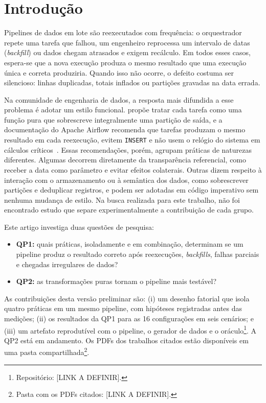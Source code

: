 \section{Introdução}

Pipelines de dados em lote são reexecutados com frequência: o orquestrador repete uma tarefa que falhou, um engenheiro reprocessa um intervalo de datas (\emph{backfill}) ou dados chegam atrasados e exigem recálculo. Em todos esses casos, espera-se que a nova execução produza o mesmo resultado que uma execução única e correta produziria. Quando isso não ocorre, o defeito costuma ser silencioso: linhas duplicadas, totais inflados ou partições gravadas na data errada.

Na comunidade de engenharia de dados, a resposta mais difundida a esse problema é adotar um estilo funcional. \citet{beauchemin2018} propõe tratar cada tarefa como uma função pura que sobrescreve integralmente uma partição de saída, e a documentação do Apache Airflow recomenda que tarefas produzam o mesmo resultado em cada reexecução, evitem \texttt{INSERT} e não usem o relógio do sistema em cálculos críticos~\citep{airflow2023}. Essas recomendações, porém, agrupam práticas de naturezas diferentes. Algumas decorrem diretamente da transparência referencial, como receber a data como parâmetro e evitar efeitos colaterais. Outras dizem respeito à interação com o armazenamento ou à semântica dos dados, como sobrescrever partições e deduplicar registros, e podem ser adotadas em código imperativo sem nenhuma mudança de estilo. Na busca realizada para este trabalho, não foi encontrado estudo que separe experimentalmente a contribuição de cada grupo.

Este artigo investiga duas questões de pesquisa:
\begin{itemize}
  \item \textbf{QP1:} quais práticas, isoladamente e em combinação, determinam se um pipeline produz o resultado correto após reexecuções, \emph{backfills}, falhas parciais e chegadas irregulares de dados?
  \item \textbf{QP2:} as transformações puras tornam o pipeline mais testável?
\end{itemize}

As contribuições desta versão preliminar são: (i) um desenho fatorial que isola quatro práticas em um mesmo pipeline, com hipóteses registradas antes das medições; (ii) os resultados da QP1 para as 16 configurações em seis cenários; e (iii) um artefato reprodutível com o pipeline, o gerador de dados e o oráculo\footnote{Repositório: [LINK A DEFINIR].}. A QP2 está em andamento. Os PDFs dos trabalhos citados estão disponíveis em uma pasta compartilhada\footnote{Pasta com os PDFs citados: [LINK A DEFINIR].}.


